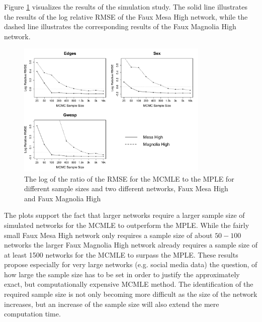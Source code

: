 \documentclass[10pt, conference, compsocconf]{IEEEtran}
\begin{document}
Figure \ref{rmse} visualizes the results of the simulation study. The solid line illustrates the results of the log relative RMSE of the Faux Mesa High network, while the dashed line illustrates the corresponding results of the Faux Magnolia High network. 
\begin{figure}[!t]
\centering
\includegraphics[width=3.6in]{RMSE_10k}
\caption{The log of the ratio of the RMSE for the MCMLE to the MPLE for different sample sizes and two different networks, Faux Mesa High and Faux Magnolia High}
\label{rmse}
\end{figure}
\noindent The plots support the fact that larger networks require a larger sample size of simulated networks for the MCMLE to outperform the MPLE. While the fairly small Faux Mesa High network only requires a sample size of about $50-100$ networks the larger Faux Magnolia High network already requires a sample size of at least 1500 networks for the MCMLE to surpass the MPLE. These results propose especially for very large networks (e.g. social media data) the question, of how large the sample size has to be set in order to justify the approximately exact, but computationally expensive MCMLE method. The identification of the required sample size is not only becoming more difficult as the size of the network increases, but an increase of the sample size will also extend the mere computation time. 
\end{document}
